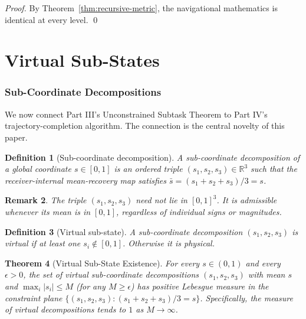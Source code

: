 \documentclass[twocolumn,a4paper]{article}
\newtheorem{theorem}{Theorem}[section]
\newtheorem{definition}[theorem]{Definition}
\newtheorem{remark}[theorem]{Remark}
\newcommand{\Real}{\mathbb{R}}
\begin{document}
\begin{proof}
By Theorem~\ref{thm:recursive-metric}, the navigational mathematics is identical at every level. \qed
\end{proof}

\part{Virtual Sub-States}

\section{Sub-Coordinate Decompositions}
\label{sec:sub-coordinate}

We now connect Part III's Unconstrained Subtask Theorem to Part IV's trajectory-completion algorithm. The connection is the central novelty of this paper.

\begin{definition}[Sub-coordinate decomposition]
\label{def:sub-coord}
A \emph{sub-coordinate decomposition} of a global coordinate $s\in[0,1]$ is an ordered triple $(s_{1},s_{2},s_{3})\in\Real^{3}$ such that the receiver-internal mean-recovery map satisfies $\bar{s}=(s_{1}+s_{2}+s_{3})/3=s$.
\end{definition}

\begin{remark}
The triple $(s_{1},s_{2},s_{3})$ need not lie in $[0,1]^{3}$. It is admissible whenever its mean is in $[0,1]$, regardless of individual signs or magnitudes.
\end{remark}

\begin{definition}[Virtual sub-state]
\label{def:virtual-sub}
A sub-coordinate decomposition $(s_{1},s_{2},s_{3})$ is \emph{virtual} if at least one $s_{i}\notin[0,1]$. Otherwise it is \emph{physical}.
\end{definition}

\begin{theorem}[Virtual Sub-State Existence]
\label{thm:virtual-existence}
For every $s\in(0,1)$ and every $\epsilon>0$, the set of virtual sub-coordinate decompositions $(s_{1},s_{2},s_{3})$ with mean $s$ and $\max_{i}|s_{i}|\leq M$ (for any $M\geq\epsilon$) has positive Lebesgue measure in the constraint plane $\{(s_{1},s_{2},s_{3})\colon(s_{1}+s_{2}+s_{3})/3=s\}$. Specifically, the measure of virtual decompositions tends to $1$ as $M\to\infty$.
\end{theorem}
\end{document}

